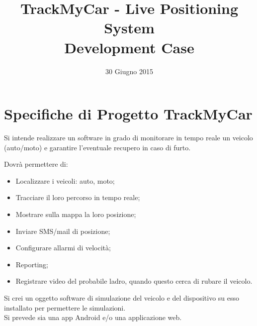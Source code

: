 \documentclass[a4paper,12pt]{article}
\begin{document}
\title{\textbf{TrackMyCar - Live Positioning System} \\ Development Case}
\date{30 Giugno 2015}
\maketitle

\section{Specifiche di Progetto TrackMyCar}
Si intende realizzare un software in grado di monitorare in tempo reale un veicolo (auto/moto) e garantire l’eventuale recupero in caso di furto.

Dovrà permettere di:
\begin{itemize}
\item Localizzare i veicoli: auto, moto;
\item Tracciare il loro percorso in tempo reale;
\item Mostrare sulla mappa la loro posizione;
\item Inviare SMS/mail di posizione;
\item Configurare allarmi di velocità;
\item Reporting;
\item Registrare video del probabile ladro, quando questo cerca di rubare il veicolo.
\end{itemize}
Si crei un oggetto software di simulazione del veicolo e del dispositivo su esso installato per permettere le simulazioni.\\
Si prevede sia una app Android e/o una applicazione web.
\end{document}
